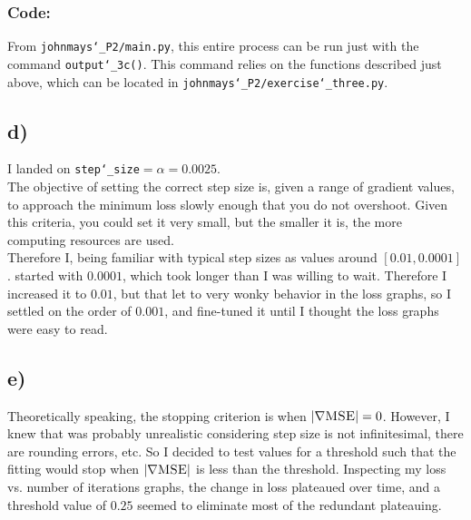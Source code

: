 \documentclass{article} %
\newcommand{\us}{\char`_}
\begin{document}
\subsubsection*{Code:}
From \texttt{johnmays\us P2/main.py}, this entire process can be run just with the command \texttt{output\us 3c()}.  This command relies on the functions described just above, which can be located in \texttt{johnmays\us P2/exercise\us three.py}.

\subsection*{d)}
I landed on \texttt{step\us size}$=\alpha=0.0025$.\\
\linebreak
The objective of setting the correct step size is, given a range of gradient values, to approach the minimum loss slowly enough that you do not overshoot.  Given this criteria, you could set it very small, but the smaller it is, the more computing resources are used.\\
Therefore I, being familiar with typical step sizes as values around $[0.01,0.0001]$. started with $0.0001$, which took longer than I was willing to wait.  Therefore I increased it to $0.01$, but that let to very wonky behavior in the loss graphs, so I settled on the order of $0.001$, and fine-tuned it until I thought the loss graphs were easy to read.
\subsection*{e)}
Theoretically speaking, the stopping criterion is when $|\nabla\textsc{MSE}|=0$.  However, I knew that was probably unrealistic considering step size is not infinitesimal, there are rounding errors, etc.  So I decided to test values for a threshold such that the fitting would stop when $|\nabla\textsc{MSE}|$ is less than the threshold.  Inspecting my loss vs. number of iterations graphs, the change in loss plateaued over time, and a threshold value of $0.25$ seemed to eliminate most of the redundant plateauing.
\end{document}
